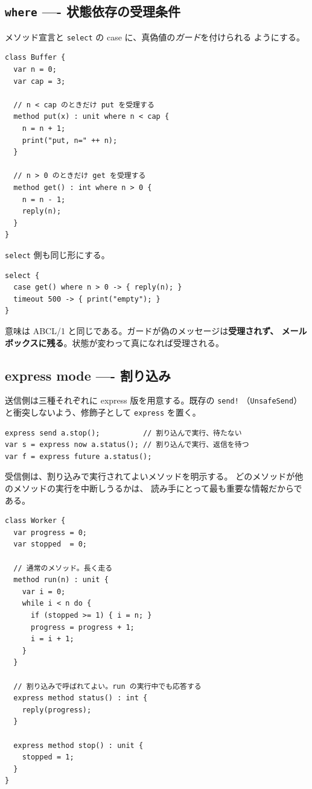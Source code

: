 \documentclass[11pt,a4paper]{ltjsarticle}
\theoremstyle{remark}
\begin{document}
\subsection{\texttt{where} ---- 状態依存の受理条件}

メソッド宣言と \texttt{select} の case に、真偽値の\emph{ガード}を付けられる
ようにする。

\begin{lstlisting}[language=AIPL]
class Buffer {
  var n = 0;
  var cap = 3;

  // n < cap のときだけ put を受理する
  method put(x) : unit where n < cap {
    n = n + 1;
    print("put, n=" ++ n);
  }

  // n > 0 のときだけ get を受理する
  method get() : int where n > 0 {
    n = n - 1;
    reply(n);
  }
}
\end{lstlisting}

\texttt{select} 側も同じ形にする。

\begin{lstlisting}[language=AIPL]
select {
  case get() where n > 0 -> { reply(n); }
  timeout 500 -> { print("empty"); }
}
\end{lstlisting}

意味は ABCL/1 と同じである。ガードが偽のメッセージは\textbf{受理されず、
メールボックスに残る}。状態が変わって真になれば受理される。

\subsection{express mode ---- 割り込み}

送信側は三種それぞれに express 版を用意する。既存の \texttt{send!}
（\texttt{UnsafeSend}）と衝突しないよう、修飾子として \texttt{express} を置く。

\begin{lstlisting}[language=AIPL]
express send a.stop();          // 割り込んで実行、待たない
var s = express now a.status(); // 割り込んで実行、返信を待つ
var f = express future a.status();
\end{lstlisting}

受信側は、割り込みで実行されてよいメソッドを明示する。
どのメソッドが他のメソッドの実行を中断しうるかは、
読み手にとって最も重要な情報だからである。

\begin{lstlisting}[language=AIPL]
class Worker {
  var progress = 0;
  var stopped  = 0;

  // 通常のメソッド。長く走る
  method run(n) : unit {
    var i = 0;
    while i < n do {
      if (stopped >= 1) { i = n; }
      progress = progress + 1;
      i = i + 1;
    }
  }

  // 割り込みで呼ばれてよい。run の実行中でも応答する
  express method status() : int {
    reply(progress);
  }

  express method stop() : unit {
    stopped = 1;
  }
}
\end{lstlisting}
\end{document}
